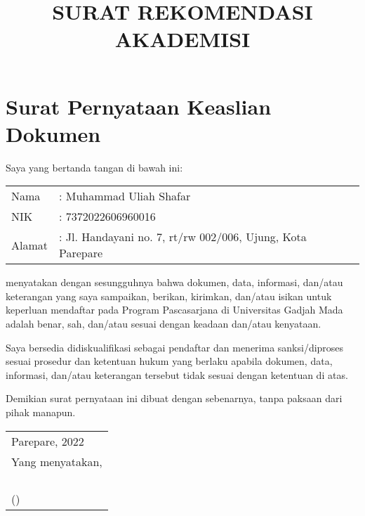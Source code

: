 \documentclass[12pt]{article}
\title{\vspace{-4ex}SURAT REKOMENDASI AKADEMISI}
\author{}
\date{\vspace{-6ex}}
\newcommand\fillin[1][3cm]{\makebox[#1]{\dotfill}}
\begin{document}
\section{Surat Pernyataan Keaslian Dokumen}

Saya yang bertanda tangan di bawah ini:

\begin{table}[htpb]
	\renewcommand{\arraystretch}{1.25}
	\begin{tabular}{p{4cm}l}
		Nama   & : Muhammad Uliah Shafar                                    \\
		NIK    & : 7372022606960016                                         \\
		Alamat & : Jl. Handayani no. 7, rt/rw 002/006, Ujung, Kota Parepare \\
	\end{tabular}
\end{table}

menyatakan dengan sesungguhnya bahwa dokumen, data, informasi, dan/atau keterangan yang saya sampaikan, berikan, kirimkan, dan/atau isikan untuk keperluan mendaftar pada Program Pascasarjana di Universitas Gadjah Mada adalah benar, sah, dan/atau sesuai dengan keadaan dan/atau kenyataan.

Saya bersedia didiskualifikasi sebagai pendaftar dan menerima sanksi/diproses sesuai prosedur dan ketentuan hukum yang berlaku apabila dokumen, data, informasi, dan/atau keterangan tersebut tidak sesuai dengan ketentuan di atas.

Demikian surat pernyataan ini dibuat dengan sebenarnya, tanpa paksaan dari pihak manapun.
\vspace{\baselineskip}

{\raggedleft
	\begin{tabular}{l@{}}
		Parepare, \fillin[3cm] 2022 \\
		Yang menyatakan,            \\
		\\
		\\
		\\
		\\
		(\fillin[6cm])              \\
	\end{tabular}\par}
\end{document}
